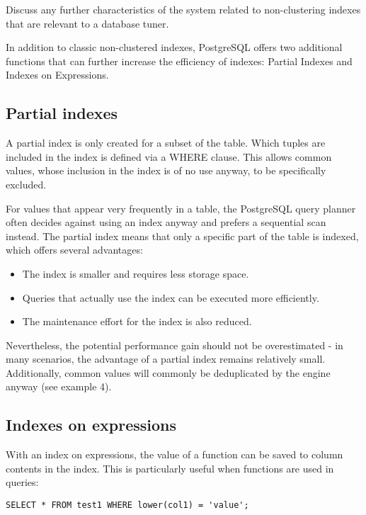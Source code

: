 \documentclass[11pt]{scrartcl}
\begin{document}
Discuss any further characteristics of the system related to non-clustering indexes that are relevant to a database tuner.

In addition to classic non-clustered indexes, PostgreSQL offers two additional functions that can further increase the efficiency of indexes: Partial Indexes and Indexes on Expressions.

\subsection{Partial indexes}

A partial index is only created for a subset of the table. Which tuples are included in the index is defined via a WHERE clause. This allows common values, whose inclusion in the index is of no use anyway, to be specifically excluded.

For values that appear very frequently in a table, the PostgreSQL query planner often decides against using an index anyway and prefers a sequential scan instead. The partial index means that only a specific part of the table is indexed, which offers several advantages:

\begin{itemize}
 \item The index is smaller and requires less storage space.
 \item Queries that actually use the index can be executed more efficiently.
 \item The maintenance effort for the index is also reduced.
\end{itemize}

Nevertheless, the potential performance gain should not be overestimated - in many scenarios, the advantage of a partial index remains relatively small.  Additionally, common values will commonly be deduplicated by the engine anyway (see example 4).

\subsection{Indexes on expressions}

With an index on expressions, the value of a function can be saved to column contents in the index. This is particularly useful when functions are used in queries:

\begin{lstlisting}[style=dbtsql]
SELECT * FROM test1 WHERE lower(col1) = 'value';
\end{lstlisting}
\end{document}
